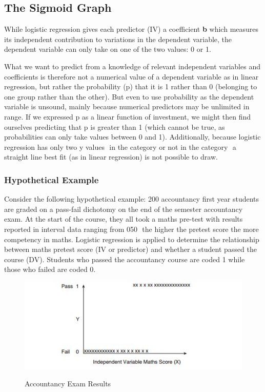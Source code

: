 \documentclass[a4paper,12pt]{article}
\begin{document}
\subsection{The Sigmoid Graph}
While logistic regression gives each predictor (IV) a coefficient \textbf{b} which measures its
independent contribution to variations in the dependent variable, the dependent variable
can only take on one of the two values: 0 or 1.

What we want to predict from a knowledge of relevant independent variables and coefficients is therefore not a numerical value of a
dependent variable as in linear regression, but rather the probability (p) that it is 1 rather
than 0 (belonging to one group rather than the other). But even to use probability as the dependent variable is unsound, mainly because numerical predictors may be unlimited in range. If we expressed p as a linear function of investment, we might then find ourselves predicting that p is greater than 1 (which cannot be true, as
probabilities can only take values between 0 and 1). Additionally, because logistic regression
has only two y values  in the category or not in the category  a straight line best fit (as in
linear regression) is not possible to draw.
\subsubsection{Hypothetical Example}
Consider the following hypothetical example:
200 accountancy first year students are graded on a pass-fail dichotomy on the end of the
semester accountancy exam. At the start of the course, they all took a maths pre-test with
results reported in interval data ranging from 050  the higher the pretest score the more
competency in maths. Logistic regression is applied to determine the relationship between
maths pretest score (IV or predictor) and whether a student passed the course (DV). Students
who passed the accountancy course are coded 1 while those who failed are coded 0.
\begin{center}
\begin{figure}
  \includegraphics[scale=0.8]{images/Logistic1}\\
  \caption{Accountancy Exam Results}
\end{figure}
\end{center}
\end{document}

